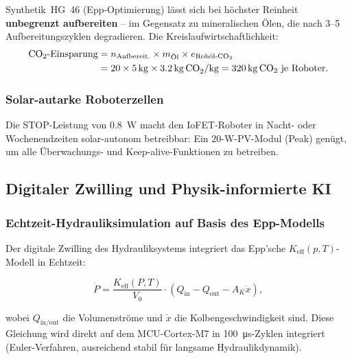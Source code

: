 ﻿\documentclass[a4paper,12pt]{scrreprt}
\theoremstyle{definition}
\begin{document}
Synthetik~HG~46 (Epp-Optimierung) lässt sich bei höchster Reinheit
\textbf{unbegrenzt aufbereiten} -- im Gegensatz zu mineralischen Ölen,
die nach 3--5 Aufbereitungszyklen degradieren.
Die Kreislaufwirtschaftlichkeit:
\begin{align}
  \text{CO}_2\text{-Einsparung} &= n_{\text{Aufbereit.}} \times m_{\text{Öl}}
    \times e_{\text{Rohöl-CO}_2} \notag \\
  &= 20 \times \SI{5}{\kilo\gram} \times \SI{3.2}{\kilo\gram\,\text{CO}_2\per\kilo\gram}
  = \SI{320}{\kilo\gram}\,\text{CO}_2 \text{ je Roboter.}
\end{align}

\subsubsection{Solar-autarke Roboterzellen}

Die STOP-Leistung von \SI{0.8}{\watt} macht den IoFET-Roboter
in Nacht- oder Wochenendzeiten solar-autonom betreibbar:
Ein 20-\si{\watt}-PV-Modul (Peak) genügt, um alle Überwachungs-
und Keep-alive-Funktionen zu betreiben.

\subsection{Digitaler Zwilling und Physik-informierte KI}

\subsubsection{Echtzeit-Hydrauliksimulation auf Basis des Epp-Modells}

Der digitale Zwilling des Hydrauliksystems integriert das
Epp'sche $K_{\text{eff}}(p,T)$-Modell in Echtzeit:

\begin{equation}
  \dot{P} = \frac{K_{\text{eff}}(P, T)}{V_0} \cdot
            \left(Q_{\text{in}} - Q_{\text{out}} - A_K \dot{x}\right),
  \label{eq:druckdynamik}
\end{equation}

wobei $Q_{\text{in/out}}$ die Volumenströme und $\dot{x}$ die
Kolbengeschwindigkeit sind. Diese Gleichung wird direkt auf dem
MCU-Cortex-M7 in \SI{100}{\micro\second}-Zyklen integriert
(Euler-Verfahren, ausreichend stabil für langsame Hydraulikdynamik).
\end{document}
